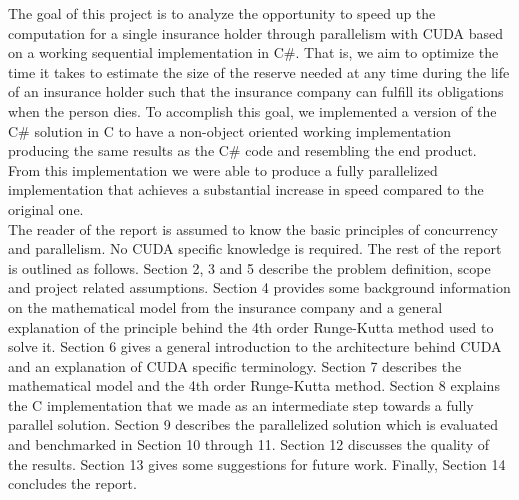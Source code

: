 The goal of this project is to analyze the opportunity to speed up the computation for a single insurance holder through parallelism with CUDA based on a working sequential implementation in C\#. That is, we aim to optimize the time it takes to estimate the size of the reserve needed at any time during the life of an insurance holder such that the insurance company can fulfill its obligations when the person dies. To accomplish this goal, we implemented a version of the C\# solution in C to have a non-object oriented working implementation producing the same results as the C\# code and resembling the end product. From this implementation we were able to produce a fully parallelized implementation that achieves a substantial increase in speed compared to the original one.\\

The reader of the report is assumed to know the basic principles of concurrency and parallelism. No CUDA specific knowledge is required. The rest of the report is outlined as follows. Section 2, 3 and 5 describe the problem definition, scope and project related assumptions. Section 4 provides some background information on the mathematical model from the insurance company and a general explanation of the principle behind the 4th order Runge-Kutta method used to solve it. Section 6 gives a general introduction to the architecture behind CUDA and an explanation of CUDA specific terminology. Section 7 describes the mathematical model and the 4th order Runge-Kutta method. Section 8 explains the C implementation that we made as an intermediate step towards a fully parallel solution. Section 9 describes the parallelized solution which is evaluated and benchmarked in Section 10 through 11. Section 12 discusses the quality of the results. Section 13 gives some suggestions for future work. Finally, Section 14 concludes the report.
